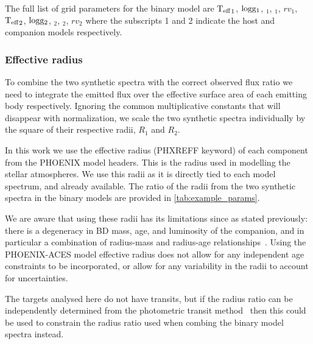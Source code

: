 {\red{} The full list of grid parameters for the binary model are \({\textrm{T}_{\mathrm{eff}}}_{1}\),  \(\textrm{logg}{}_1\), \feh{}\(_1\), \alphafe{}\(_1\), \({rv}_1\), \({\textrm{T}_{\mathrm{eff}}}_{2}\), \(\textrm{logg}{}_2\), \feh{}\(_2\), \alphafe{}\(_2\), \({rv}_2\) where the subscripts 1 and 2 indicate the host and companion models respectively.}






\subsubsection{Effective radius}
\label{subsection-radius}

To combine the two synthetic spectra with the correct observed flux ratio we need to integrate the emitted flux over the effective surface area of each emitting body respectively.
Ignoring the common multiplicative constants that will disappear with normalization, we scale the two synthetic spectra individually by the square of their respective radii, \(R_1\) and \(R_2\).

In this work we use the effective radius (PHXREFF keyword) of each component from the {PHOENIX} model headers.
This is the radius used in modelling the stellar atmospheres.
We use this radii as it is directly tied to each model spectrum, and already available.
The ratio of the radii from the two synthetic spectra in the binary models are provided in \cref{tab:example_params}.

We are aware that using these radii has its limitations since as stated previously: there is a degeneracy in {BD} mass, age, and luminosity of the companion, and in particular a combination of radius-mass and radius-age relationships~\citep{sorahana_radii_2013}.
Using the {PHOENIX-ACES} model effective radius does not allow for any independent age constraints to be incorporated, or allow for any variability in the radii to account for uncertainties.

The targets analysed here do not have transits, but if the radius ratio can be independently determined from the photometric transit method~\citep{deeg_photometric_1998} then this could be used to constrain the radius ratio used when combing the binary model spectra instead.


